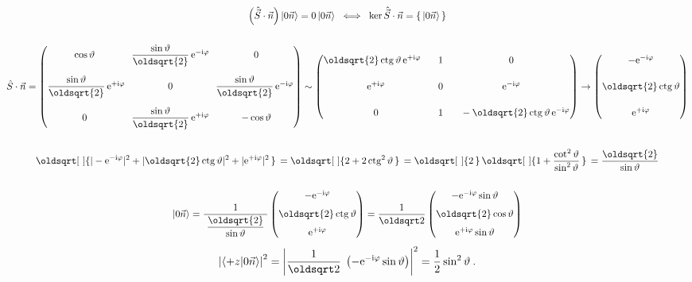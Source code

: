 \documentclass[10pt,a4paper]{article}
\renewcommand*{\sqrt}[2][\ ]{\oldsqrt[#1]{#2\,}\,}
\def\ph{\phantom}
\newcommand{\const}[1]{\text{#1}}
\newcommand{\mat}[1]{
    \begin{pmatrix}
        #1
    \end{pmatrix}
}
\newcommand{\ket}[1]{\left| #1 \right>}
\newcommand{\braket}[2]{\left< #1 \middle| #2 \right>}
\newcommand{\e}[1]{\const{e}^{#1}}
\renewcommand{\i}{\const{i}}
\def\ctg{\operatorname{ctg}}
\begin{document}
\begin{gather*}
    \left(\hat{\vec S} \cdot \vec n\right) \ket{0\vec n} = 0 \ket{0\vec n}
    \;\iff\;
    \ker \hat{\vec S} \cdot \vec n = \{\, \ket{0 \vec n} \,\}
    \\\\
    \hat S \cdot \vec n
    = \mat{
        \cos \vartheta &
        \dfrac{\sin \vartheta}{\oldsqrt{2}} \, \e{-\i \varphi} &
        0
        \\[15pt]
        \dfrac{\sin \vartheta}{\oldsqrt{2}} \, \e{+\i \varphi} \!\!&
        0 & \!\!
        \dfrac{\sin \vartheta}{\oldsqrt{2}} \, \e{-\i \varphi}
        \\[15pt]
        0 &
        \dfrac{\sin \vartheta}{\oldsqrt{2}} \, \e{+\i \varphi} &
        -\cos \vartheta
    }
    \sim \mat{
        \oldsqrt{2} \ctg \vartheta \, \e{+\i \varphi} \ph{+}&
        1  &
        0
        \\[15pt]
        \e{+\i \varphi} &
        0 &
        \e{-\i \varphi}
        \\[15pt]
        0 &
        1 &
        \ph{+}-\oldsqrt{2} \ctg \vartheta \, \e{-\i \varphi}
    }
    \to \mat{
        -\e{-\i \varphi} \\[15pt]
        \oldsqrt{2} \ctg \vartheta \\[15pt]
        \e{+\i \varphi}
    }
    \\\\
    \sqrt{
        |-\e{-\i \varphi}|^2 +
        |\oldsqrt{2} \ctg \vartheta|^2 +
        |\e{+\i \varphi}|^2
    }
    = \sqrt{
        2 + 2 \ctg^2 \vartheta
    }
    = \sqrt{2} \sqrt{1 + \frac{\cot^2 \vartheta}{\sin^2 \vartheta}}
    = \frac{\oldsqrt{2}}{\sin \vartheta}
    \\\\
    \ket{0\vec n}
    =
    \frac{1}{\; \dfrac{\oldsqrt{2}}{\sin \vartheta} \;}
    \mat{
        -\e{-\i \varphi} \\[7pt]
        \oldsqrt{2} \ctg \vartheta \\[7pt]
        \e{+\i \varphi}
    }
    =
    \frac{1}{\oldsqrt 2}
    \mat{
        -\e{-\i \varphi} \sin \vartheta \\[7pt]
        \oldsqrt{2} \cos \vartheta \\[7pt]
        \e{+\i \varphi} \sin \vartheta
    }
\end{gather*}
\begin{gather*}
    \left| \braket{+z}{0\vec n} \right|^2
    = \left|
    \frac{1}{\oldsqrt 2} \; \left( -\e{-\i \varphi} \sin \vartheta \right) \right|^2
    = \frac{1}{2} \sin^2 \vartheta
    \: .
\end{gather*}
\end{document}
